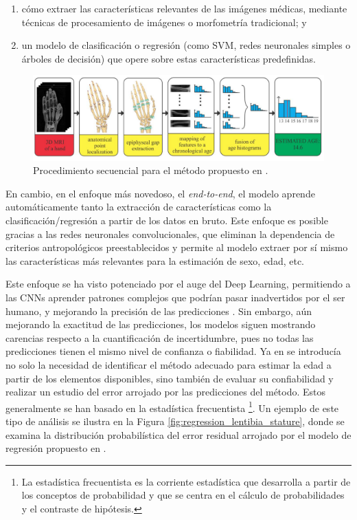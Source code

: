 \begin{enumerate}
    \item cómo extraer las características relevantes de las imágenes médicas, mediante técnicas de procesamiento de 
    imágenes o morfometría tradicional; y
    \item un modelo de clasificación o regresión (como SVM, redes neuronales simples o árboles de decisión) que opere 
    sobre estas características predefinidas.
\end{enumerate}

\begin{figure}[h]
    \centering
    \includegraphics[width=\textwidth]{capitulos/cap_01/imagenes/MRI_pipeline.png}
    \caption{Procedimiento secuencial para el método propuesto en \cite{stern2014}.} 
    \label{fig:MRI_pipeline}
\end{figure}

En cambio, en el enfoque más novedoso, el \textit{end-to-end}, el modelo aprende automáticamente 
tanto la extracción de características como la clasificación/regresión a partir de los datos en bruto. Este enfoque 
es posible gracias a las redes neuronales convolucionales, que eliminan la dependencia de criterios 
antropológicos preestablecidos y permite al modelo extraer por sí mismo las características más relevantes para la
estimación de sexo, edad, etc. 

Este enfoque se ha visto potenciado por el auge del Deep Learning, permitiendo a las CNNs aprender patrones complejos 
que podrían pasar inadvertidos por el ser humano, y mejorando la precisión de las predicciones \cite{stern2019, venema2022}. 
Sin embargo, aún mejorando la exactitud de las predicciones, los modelos siguen mostrando carencias respecto a la 
cuantificación de incertidumbre, pues no todas las predicciones tienen el mismo nivel de confianza o fiabilidad.
Ya en \cite{ferrante2009} se introducía no solo la necesidad de identificar el método adecuado para estimar la edad a 
partir de los elementos disponibles, sino también de evaluar su confiabilidad y realizar un estudio del error arrojado por 
las predicciones del método. 
Estos generalmente se han basado en la estadística frecuentista \cite{verma2020, stepanovsky2024, heinrich2024}
\footnote{La estadística frecuentista es la corriente estadística que desarrolla a partir de los conceptos de probabilidad
y que se centra en el cálculo de probabilidades y el contraste de hipótesis.}.
Un ejemplo de este tipo de análisis se ilustra en la Figura \ref{fig:regression_lentibia_stature}, donde se examina la 
distribución probabilística del error residual arrojado por el modelo de regresión propuesto en \cite{verma2020}.

